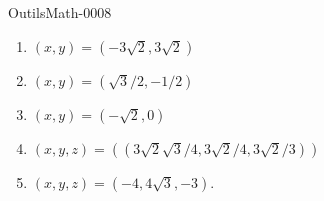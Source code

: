 
\begin{corrige}{OutilsMath-0008}

	\begin{enumerate}
		\item
			$(x,y)=(-3\sqrt{2},3\sqrt{2})$
		\item
			$(x,y)=(\sqrt{3}/2,-1/2)$
		\item
			$(x,y)=(-\sqrt{2},0)$
		\item
			$(x,y,z)=((3\sqrt{2}\sqrt{3}/4, 3\sqrt{2}/4, 3\sqrt{2}/3))$
		\item
			$(x,y,z)=(-4,4\sqrt{3} , -3)$.
	\end{enumerate}

\end{corrige}
